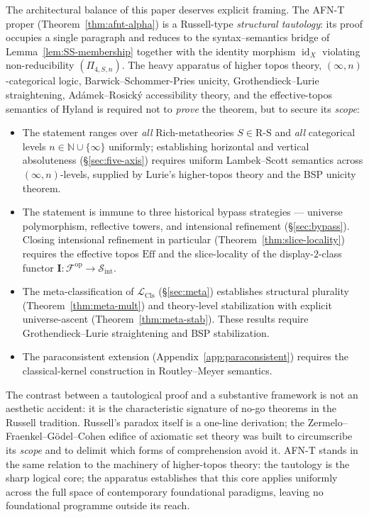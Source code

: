 \documentclass[11pt]{article}
\theoremstyle{plain}
\theoremstyle{definition}
\newcommand{\RS}{\mathrm{R\text{-}S}}
\newcommand{\cS}{\mathcal{S}}
\newcommand{\cF}{\mathcal{F}}
\newcommand{\LCls}{\mathcal{L}_{\mathrm{Cls}}}
\newcommand{\Sint}{\cS_{\mathrm{int}}}
\newcommand{\II}{\mathbf{I}}
\DeclareMathOperator{\id}{id}
\begin{document}
The architectural balance of this paper deserves explicit framing. The AFN-T proper (Theorem~\ref{thm:afnt-alpha}) is a Russell-type \emph{structural tautology}: its proof occupies a single paragraph and reduces to the syntax--semantics bridge of Lemma~\ref{lem:SS-membership} together with the identity morphism $\id_X$ violating non-reducibility $(\Pi_{4, S, n})$. The heavy apparatus of higher topos theory, $(\infty, n)$-categorical logic, Barwick--Schommer-Pries unicity, Grothendieck--Lurie straightening, Ad\'amek--Rosick\'y accessibility theory, and the effective-topos semantics of Hyland is required not to \emph{prove} the theorem, but to secure its \emph{scope}:
\begin{itemize}[leftmargin=2.5em]
\item[\textbf{(S1)}] The statement ranges over \emph{all} Rich-metatheories $S \in \RS$ and \emph{all} categorical levels $n \in \mathbb{N} \cup \{\infty\}$ uniformly; establishing horizontal and vertical absoluteness (\S\ref{sec:five-axis}) requires uniform Lambek--Scott semantics across $(\infty, n)$-levels, supplied by Lurie's higher-topos theory and the BSP unicity theorem.
\item[\textbf{(S2)}] The statement is immune to three historical bypass strategies --- universe polymorphism, reflective towers, and intensional refinement (\S\ref{sec:bypass}). Closing intensional refinement in particular (Theorem~\ref{thm:slice-locality}) requires the effective topos $\mathrm{Eff}$ and the slice-locality of the display-$2$-class functor $\II : \cF^{\mathrm{op}} \to \Sint$.
\item[\textbf{(S3)}] The meta-classification of $\LCls$ (\S\ref{sec:meta}) establishes structural plurality (Theorem~\ref{thm:meta-mult}) and theory-level stabilization with explicit universe-ascent (Theorem~\ref{thm:meta-stab}). These results require Grothendieck--Lurie straightening and BSP stabilization.
\item[\textbf{(S4)}] The paraconsistent extension (Appendix~\ref{app:paraconsistent}) requires the classical-kernel construction in Routley--Meyer semantics.
\end{itemize}
The contrast between a tautological proof and a substantive framework is not an aesthetic accident: it is the characteristic signature of no-go theorems in the Russell tradition. Russell's paradox itself is a one-line derivation; the Zermelo--Fraenkel--G\"odel--Cohen edifice of axiomatic set theory was built to circumscribe its \emph{scope} and to delimit which forms of comprehension avoid it. AFN-T stands in the same relation to the machinery of higher-topos theory: the tautology is the sharp logical core; the apparatus establishes that this core applies uniformly across the full space of contemporary foundational paradigms, leaving no foundational programme outside its reach.
\end{document}
